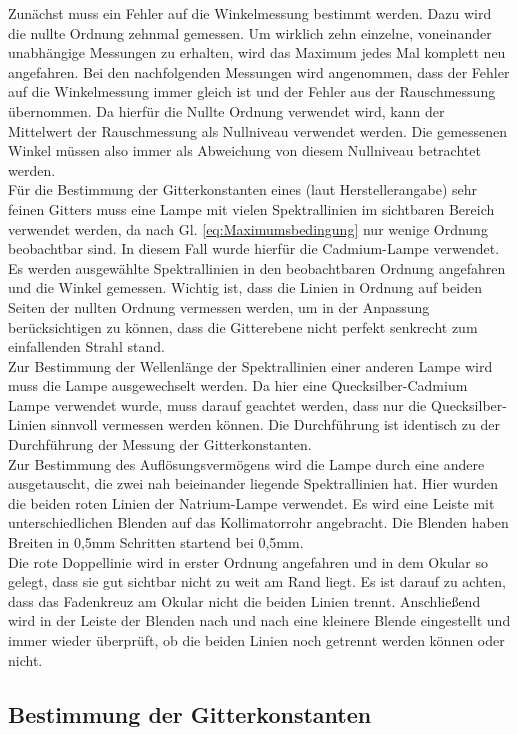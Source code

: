 \documentclass[12pt,a4paper]{article}
\begin{document}
	Zunächst muss ein Fehler auf die Winkelmessung bestimmt werden. Dazu wird die nullte Ordnung zehnmal gemessen. Um wirklich zehn einzelne, voneinander unabhängige Messungen zu erhalten, wird das Maximum jedes Mal komplett neu angefahren. Bei den nachfolgenden Messungen wird angenommen, dass der Fehler auf die Winkelmessung immer gleich ist und der Fehler aus der Rauschmessung übernommen. Da hierfür die Nullte Ordnung verwendet wird, kann der Mittelwert der Rauschmessung als Nullniveau verwendet werden. Die gemessenen Winkel müssen also immer als Abweichung von diesem Nullniveau betrachtet werden.\\
	Für die Bestimmung der Gitterkonstanten eines (laut Herstellerangabe) sehr feinen Gitters muss eine Lampe mit vielen Spektrallinien im sichtbaren Bereich verwendet werden, da nach Gl. \ref{eq:Maximumsbedingung} nur wenige Ordnung beobachtbar sind. In diesem Fall wurde hierfür die Cadmium-Lampe verwendet. Es werden ausgewählte Spektrallinien in den beobachtbaren Ordnung angefahren und die Winkel gemessen. Wichtig ist, dass die Linien in Ordnung auf beiden Seiten der nullten Ordnung vermessen werden, um in der Anpassung berücksichtigen zu können, dass die Gitterebene nicht perfekt senkrecht zum einfallenden Strahl stand.\\
	Zur Bestimmung der Wellenlänge der Spektrallinien einer anderen Lampe wird muss die Lampe ausgewechselt werden. Da hier eine Quecksilber-Cadmium Lampe verwendet wurde, muss darauf geachtet werden, dass nur die Quecksilber-Linien sinnvoll vermessen werden können. Die Durchführung ist identisch zu der Durchführung der Messung der Gitterkonstanten.\\
	Zur Bestimmung des Auflösungsvermögens wird die Lampe durch eine andere ausgetauscht, die zwei nah beieinander liegende Spektrallinien hat. Hier wurden die beiden roten Linien der Natrium-Lampe verwendet. Es wird eine Leiste mit unterschiedlichen Blenden auf das Kollimatorrohr angebracht. Die Blenden haben Breiten in 0,5mm Schritten startend bei 0,5mm.\\
	Die rote Doppellinie wird in erster Ordnung angefahren und in dem Okular so gelegt, dass sie gut sichtbar nicht zu weit am Rand liegt. Es ist darauf zu achten, dass das Fadenkreuz am Okular nicht die beiden Linien trennt. Anschließend wird in der Leiste der Blenden nach und nach eine kleinere Blende eingestellt und immer wieder überprüft, ob die beiden Linien noch getrennt werden können oder nicht.
	
	\subsection{Bestimmung der Gitterkonstanten}
	
\end{document}
